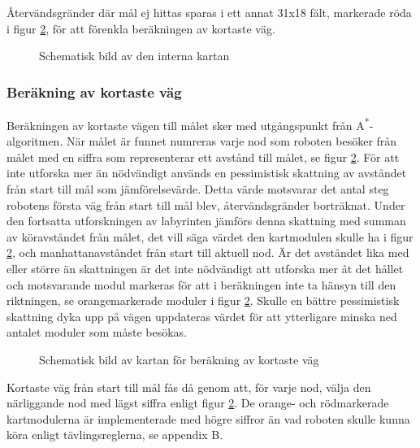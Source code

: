 \documentclass[11pt]{article}
\begin{document}
\begin{flushleft}
Återvändsgränder där mål ej hittas sparas i ett annat 31x18 fält, markerade röda i figur \ref{path}, för att förenkla beräkningen av kortaste väg. 

\begin{figure}[htbp]
\centering
\noindent\resizebox{0.7\linewidth}{!}{
}
\caption{Schematisk bild av den interna kartan} \label{map}
\end{figure}

\subsubsection{Beräkning av kortaste väg} \label{shortestPath}
Beräkningen av kortaste vägen till målet sker med utgångspunkt från A\textsuperscript{*}-algoritmen. När målet är funnet numreras varje nod som roboten besöker från målet med en siffra som representerar ett avstånd till målet, se figur \ref{path}. För att inte utforska mer än nödvändigt används en pessimistisk skattning av avståndet från start till mål som jämförelsevärde. Detta värde motsvarar det antal steg robotens första väg från start till mål blev, återvändsgränder borträknat. Under den fortsatta utforskningen av labyrinten jämförs denna skattning med summan av köravståndet från målet, det vill säga värdet den kartmodulen skulle ha i figur \ref{path}, och manhattanavståndet från start till aktuell nod. Är det avståndet lika med eller större än skattningen är det inte nödvändigt att utforska mer åt det hållet och motsvarande modul markeras för att i beräkningen inte ta hänsyn till den riktningen, se orangemarkerade moduler i figur \ref{path}. Skulle en bättre pessimistisk skattning dyka upp på vägen uppdateras värdet för att ytterligare minska ned antalet moduler som måste besökas.

\begin{figure}[htbp]
\centering
\noindent\resizebox{0.7\linewidth}{!}{
}
\caption{Schematisk bild av kartan för beräkning av kortaste väg} \label{path}
\end{figure}


Kortaste väg från start till mål fås då genom att, för varje nod, välja den närliggande nod med lägst siffra enligt figur \ref{path}. De orange- och rödmarkerade kartmodulerna är implementerade med högre siffror än vad roboten skulle kunna köra enligt tävlingsreglerna, se appendix B.

\pagebreak


\end{flushleft}
\end{document}
